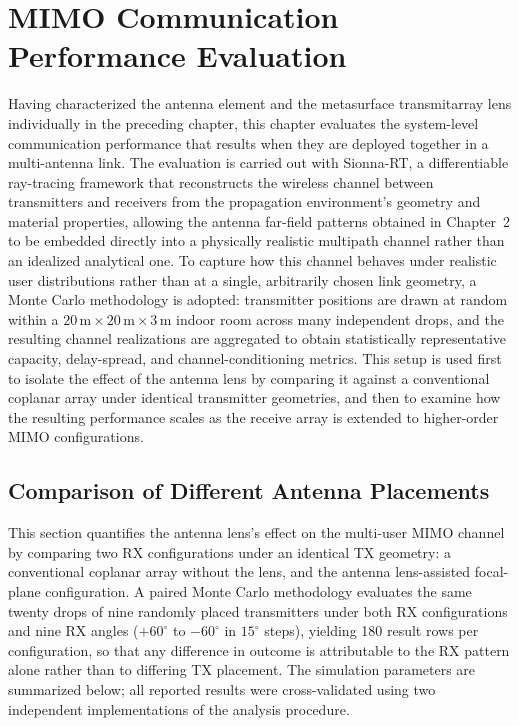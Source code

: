 \chapter{MIMO Communication Performance Evaluation}

Having characterized the antenna element and the metasurface transmitarray lens individually in the preceding chapter, this chapter evaluates the system-level communication performance that results when they are deployed together in a multi-antenna link. The evaluation is carried out with Sionna-RT, a differentiable ray-tracing framework that reconstructs the wireless channel between transmitters and receivers from the propagation environment's geometry and material properties, allowing the antenna far-field patterns obtained in Chapter~2 to be embedded directly into a physically realistic multipath channel rather than an idealized analytical one. To capture how this channel behaves under realistic user distributions rather than at a single, arbitrarily chosen link geometry, a Monte Carlo methodology is adopted: transmitter positions are drawn at random within a $20\,\text{m}\times20\,\text{m}\times3\,\text{m}$ indoor room across many independent drops, and the resulting channel realizations are aggregated to obtain statistically representative capacity, delay-spread, and channel-conditioning metrics. This setup is used first to isolate the effect of the antenna lens by comparing it against a conventional coplanar array under identical transmitter geometries, and then to examine how the resulting performance scales as the receive array is extended to higher-order MIMO configurations.

\section{Comparison of Different Antenna Placements}\label{sec:comparison-antenna-placements}



This section quantifies the antenna lens's effect on the multi-user MIMO channel by comparing two RX configurations under an identical TX geometry: a conventional coplanar array without the lens, and the antenna lens-assisted focal-plane configuration. A paired Monte Carlo methodology evaluates the same twenty drops of nine randomly placed transmitters under both RX configurations and nine RX angles ($+60^\circ$ to $-60^\circ$ in $15^\circ$ steps), yielding 180 result rows per configuration, so that any difference in outcome is attributable to the RX pattern alone rather than to differing TX placement. The simulation parameters are summarized below; all reported results were cross-validated using two independent implementations of the analysis procedure.

